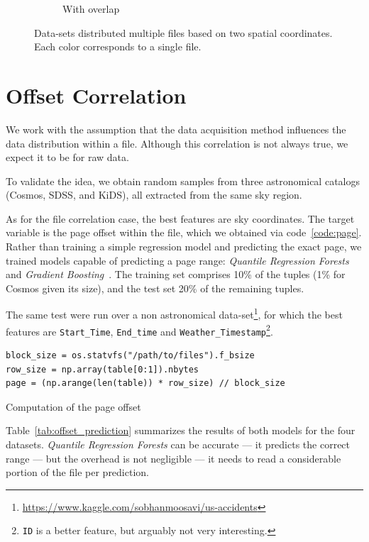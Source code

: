 \begin{figure}[htbp]
\begin{subfigure}[]{0.5\textwidth}
    \caption{With overlap}\label{subfig:mer_multifile}
    \end{subfigure}
    \caption{
        Data-sets distributed multiple files based on two spatial coordinates.
        Each color corresponds to a single file.
    }
    \label{fig:tree_cat_cut}
\end{figure}


\section{Offset Correlation}
\label{sec:offset_correlation}

We work with the assumption that the data acquisition method influences
the data distribution within a file. Although this correlation is not always
true, we expect it to be for raw data.

To validate the idea, we obtain random samples from three astronomical catalogs
(\gls{Cosmos}\cite{laigle2016cosmos2015}, \gls{SDSS}\cite{SDSS14}, and \gls{KiDS}\cite{de2013kilo}),
all extracted from the same sky region.

As for the file correlation case, the best features are sky coordinates.
The target variable is the page offset within the file, which we obtained via code~\ref{code:page}.
Rather than training a simple regression model and predicting the exact page, we trained models
capable of predicting a page range: \textit{Quantile Regression Forests}~\cite{meinshausen2006}
and \textit{Gradient Boosting}~\cite{mason2000}.
The training set comprises 10\% of the tuples (1\% for Cosmos given its size), and the test
set 20\% of the remaining tuples.

The same test were run over a non astronomical data-set\footnote{\url{https://www.kaggle.com/sobhanmoosavi/us-accidents}}, for which
the best features are \texttt{Start\_Time}, \texttt{End\_time} and
\texttt{Weather\_Timestamp}\footnote{\texttt{ID} is a better feature, but arguably not very interesting.}.

\begin{listing}[htpb]
\begin{verbatim}
block_size = os.statvfs("/path/to/files").f_bsize
row_size = np.array(table[0:1]).nbytes
page = (np.arange(len(table)) * row_size) // block_size
\end{verbatim}
\caption{Computation of the page offset}
\label{code:page}
\end{listing}

Table~\ref{tab:offset_prediction} summarizes the results of both models
for the four datasets. \textit{Quantile Regression Forests} can be accurate --- it predicts
the correct range --- but the overhead is not negligible --- it needs to read
a considerable portion of the file per prediction.

